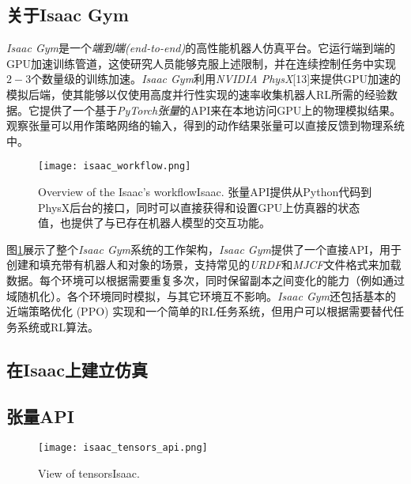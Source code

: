\subsection[关于Isaac Gym]{关于Isaac Gym}
\emph{Isaac Gym}是一个\emph{端到端(end-to-end)}的高性能机器人仿真平台。它运行端到端的GPU加速训练管道，这使研究人员能够克服上述限制，并在连续控制任务中实现$2-3$个数量级的训练加速。\emph{Isaac Gym}利用\emph{NVIDIA PhysX}[13]来提供GPU加速的模拟后端，使其能够以仅使用高度并行性实现的速率收集机器人RL所需的经验数据。它提供了一个基于\emph{PyTorch张量}的API来在本地访问GPU上的物理模拟结果。观察张量可以用作策略网络的输入，得到的动作结果张量可以直接反馈到物理系统中。

\begin{figure}
  \centering
  \caption[short]{Overview of the Isaac's workflowIsaac\cite[p5]{Makoviychuk_Wawrzyniak_Guo_Lu_Storey_Macklin_Hoeller_Rudin_Allshire_Handa_et_al_2021}. 张量API提供从Python代码到PhysX后台的接口，同时可以直接获得和设置GPU上仿真器的状态值，也提供了与已存在机器人模型的交互功能。}
  \label{fig:isaac_workflow}
  \texttt{[image: isaac\_workflow.png]}
  
\end{figure}

图\ref{fig:isaac_workflow}展示了整个\emph{Isaac Gym}系统的工作架构，\emph{Isaac Gym}提供了一个直接API，用于创建和填充带有机器人和对象的场景，支持常见的\emph{URDF}和\emph{MJCF}文件格式来加载数据。每个环境可以根据需要重复多次，同时保留副本之间变化的能力（例如通过域随机化\cite[p]{Tobin_Fong_Ray_Schneider_Zaremba_Abbeel_2017}）。各个环境同时模拟，与其它环境互不影响。\emph{Isaac Gym}还包括基本的近端策略优化 (PPO) 实现和一个简单的RL任务系统，但用户可以根据需要替代任务系统或RL算法。
\subsection[在Isaac上建立仿真]{在Isaac上建立仿真}

\subsection[张量API]{张量API}
\begin{figure}
  \centering
  \caption[View of tensors.]{View of tensorsIsaac\cite[p8]{Makoviychuk_Wawrzyniak_Guo_Lu_Storey_Macklin_Hoeller_Rudin_Allshire_Handa_et_al_2021}.}
  \label{fig:isaac_tensors_api}
  \texttt{[image: isaac\_tensors\_api.png]}
\end{figure}

